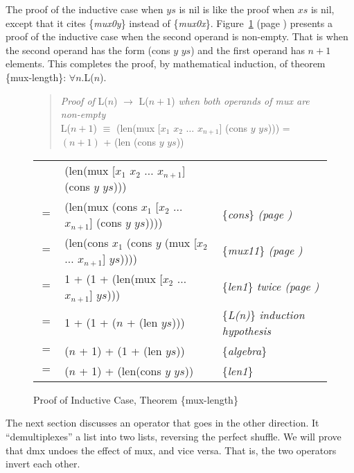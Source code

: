 The proof of the inductive case when $ys$ is nil
is like the proof when $xs$ is nil,
except that it cites \{\emph{mux0y}\} instead of \{\emph{mux0x}\}.
Figure~\ref{fig:prf-mux-len-induc} (page \pageref{fig:prf-mux-len-induc})
presents a proof  of the inductive case when the second operand is non-empty.
That is when the second operand has the form (cons $y$ $ys$)
and the first operand has $n+1$ elements.
This completes the proof, by mathematical induction, of
theorem \{mux-length\}: $\forall n.$L($n$).

\begin{figure}
\begin{quote}
\emph{Proof of} L($n$) $\rightarrow$ L($n+1$) \emph{when both operands of mux are non-empty}\\
L($n+1$) $\equiv$ (len(mux [$x_1$ $x_2$ $\dots$ $x_{n+1}$] (cons $y$ $ys$))) = $(n+1)$ + (len (cons $y$ $ys$))
\end{quote}
\begin{center}
\begin{tabular}{lll}
    & (len(mux [$x_1$ $x_2$ $\dots$ $x_{n+1}$] (cons $y$ $ys$)))        &   \\
$=$ & (len(mux (cons $x_1$ [$x_2$ $\dots$ $x_{n+1}$] (cons $y$ $ys$)))) & \{\emph{cons}\} \emph{(page \pageref{first-rest-cons})} \\
$=$ & (len(cons $x_1$ (cons $y$ (mux [$x_2$ $\dots$ $x_{n+1}$] $ys$)))) & \{\emph{mux11}\} \emph{(page \pageref{axioms:mux})}\\
$=$ & 1 + (1 + (len(mux [$x_2$ $\dots$ $x_{n+1}$] $ys$)))               & \{\emph{len1}\} \emph{twice (page \pageref{len-equations})}\\
$=$ & 1 + (1 + ($n$ + (len $ys$)))                                      & \{\emph{L(n)}\} \emph{induction hypothesis} \\
$=$ & ($n$ + 1) + (1 + (len $ys$))                                      & \{\emph{algebra}\} \\
$=$ & ($n$ + 1) + (len(cons $y$ $ys$))                                  & \{\emph{len1}\} \\
\end{tabular}
\end{center}
\caption{Proof of Inductive Case, Theorem \{mux-length\}}
\label{fig:prf-mux-len-induc}
\end{figure}

The next section discusses an operator that goes in the other direction.
It ``demultiplexes'' a list into two lists, reversing the perfect shuffle.
We will prove that dmx undoes the effect of mux, and vice versa.
That is, the two operators invert each other.

